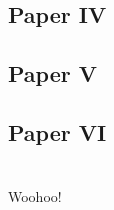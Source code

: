 \documentclass{UUThesisTemplate}
\begin{document}
%
\section*{Paper IV}





%
\section*{Paper V}





%
\section*{Paper VI}





%
\chapter{{}}
{\noteunic
Woohoo!
}





%
\end{document}
